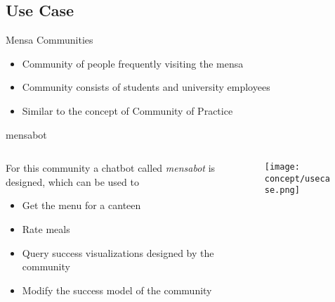 \subsection{Use Case}
\begin{frame}{Mensa Communities}
  \begin{itemize}
    \item Community of people frequently visiting the mensa
    \item Community consists of students and university employees
    \item Similar to the concept of Community of Practice %
  \end{itemize}
\end{frame}



\begin{frame}{mensabot}
  \begin{columns}
    \begin{column}[]{0.3\textwidth}
      For this community a chatbot called \emph{mensabot} is designed, which can be used to
  \begin{itemize}
    \item Get the menu for a canteen
    \item Rate meals
    \item Query success visualizations designed by the community
    \item Modify the success model of the community
  \end{itemize}

    \end{column}
    \begin{column}[]{0.7\textwidth}
      \begin{figure}
          \centering
          \texttt{[image: concept/usecase.png]}
      \end{figure}
    \end{column}     
  \end{columns}
\end{frame}

